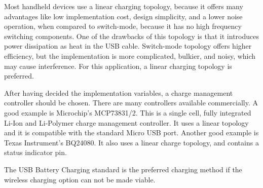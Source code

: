 Most handheld devices use a linear charging topology, because it offers many advantages like low implementation cost, design simplicity, and a lower noise operation, when compared to switch-mode, because it has no high frequency switching components. One of the drawbacks of this topology is that it introduces power dissipation as heat in the USB cable. Switch-mode topology offers higher efficiency, but the implementation is more complicated, bulkier, and noisy, which may cause interference. For this application, a linear charging topology is preferred.

After having decided the implementation variables, a charge management controller should be chosen. There are many controllers available commercially. A good example is Microchip's MCP73831/2. This is a single cell, fully integrated Li-Ion and Li-Polymer charge management controller. It uses a linear topology and it is compatible with the standard Micro USB port. Another good example is Texas Instrument's BQ24080. It also uses a linear charge topology, and contains a status indicator pin.

The USB Battery Charging standard is the preferred charging method if the wireless charging option can not be made viable.
